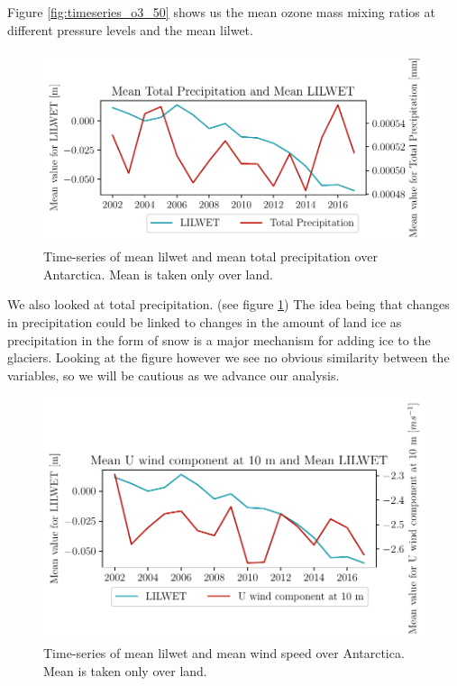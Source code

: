 \documentclass[../main.tex]{subfiles}
\begin{document}
Figure \ref{fig:timeseries_o3_50} shows us the mean ozone mass mixing ratios at different pressure levels and the mean \gls{lilwet}.

\begin{figure}[hbt!]
    \centering
    \includegraphics{images/2021w5/chapter7/hres/tiemseries_tp_LIC}
    \caption{Time-series of mean \gls{lilwet} and mean total precipitation over Antarctica. Mean is taken only over land.}
    \label{fig:timeseries_tp}
\end{figure}

We also looked at total precipitation. (see figure \ref{fig:timeseries_tp}) The idea being that changes in precipitation could be linked to changes in the amount of land ice as precipitation in the form of snow is a major mechanism for adding ice to the glaciers. Looking at the figure however we see no obvious similarity between the variables, so we will be cautious as we advance our analysis.

\begin{figure}[hbt!]
    \centering
    \includegraphics{images/2021w5/chapter7/hres/tiemseries_u_10_LIC}
    \caption{Time-series of mean \gls{lilwet} and mean wind speed over Antarctica. Mean is taken only over land.}
    \label{fig:timeseries_u_10}
\end{figure}
\end{document}
